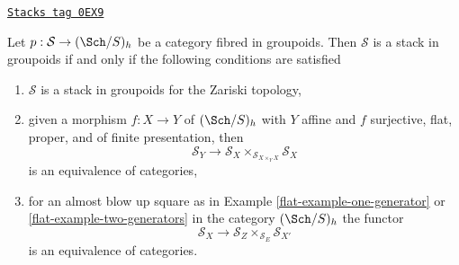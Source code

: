 \begin{lemma}
\label{flat-lemma-refine-check-h-stack}
\href{https://stacks.math.columbia.edu/tag/0EX9}{\texttt{Stacks tag 0EX9}}

Let $p : \mathcal{S} \to (\Sch/S)_h$ be a category fibred in groupoids.
Then $\mathcal{S}$ is a stack in groupoids if and only if the following
conditions are satisfied
\begin{enumerate}
\item $\mathcal{S}$ is a stack in groupoids for the Zariski topology,
\item given a morphism $f : X \to Y$ of $(\Sch/S)_h$ with $Y$ affine
and $f$ surjective, flat, proper, and of finite presentation, then
$$
\mathcal{S}_Y \longrightarrow
\mathcal{S}_X \times_{\mathcal{S}_{X \times_Y X}} \mathcal{S}_X
$$
is an equivalence of categories,
\item for an almost blow up square as in
Example \ref{flat-example-one-generator} or \ref{flat-example-two-generators}
in the category $(\Sch/S)_h$ the functor
$$
\mathcal{S}_X \longrightarrow
\mathcal{S}_Z \times_{\mathcal{S}_E} \mathcal{S}_{X'}
$$
is an equivalence of categories.
\end{enumerate}
\end{lemma}

